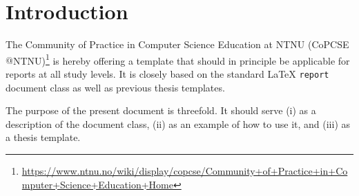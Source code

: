\section{Introduction}

The Community of Practice in Computer Science Education at NTNU (CoPCSE\-$@$NTNU)\footnote{\url{https://www.ntnu.no/wiki/display/copcse/Community+of+Practice+in+Computer+Science+Education+Home}} is hereby offering a template that should in principle be applicable for reports at all study levels. It is closely based on the standard \LaTeX{} \texttt{report} document class as well as previous thesis templates.

The purpose of the present document is threefold. It should serve (i) as a description of the document class, (ii) as an example of how to use it, and (iii) as a thesis template.